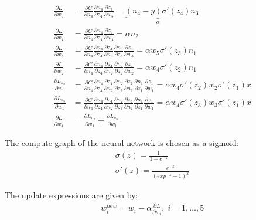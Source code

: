 \documentclass[a4paper,12pt]{article}
\begin{document}
\begin{equation}
\begin{align}
\frac{\partial L}{\partial w_5} &=\frac{\partial C}{\partial n_4}\frac{\partial n_4}{\partial z_4}\frac{\partial z_4}{\partial w_5}=\underbrace{(n_4-y)\sigma'(z_4)}_{\alpha}n_3\\
\frac{\partial L}{\partial w_4} &=\frac{\partial C}{\partial n_4}\frac{\partial n_4}{\partial z_4}\frac{\partial z_4}{\partial w_4}=\alpha n_2\\
\frac{\partial L}{\partial w_3} &= \frac{\partial C}{\partial n_4}\frac{\partial n_4}{\partial z_4}\frac{\partial z_4}{\partial n_3} \frac{\partial n_3}{\partial z_3}\frac{\partial z_3}{\partial w_3} = \alpha w_5\sigma'(z_3)n_1\\
\frac{\partial L}{\partial w_2} &= \frac{\partial C}{\partial n_4}\frac{\partial n_4}{\partial z_4}\frac{\partial z_4}{\partial n_2} \frac{\partial n_2}{\partial z_2}\frac{\partial z_2}{\partial w_2}= \alpha w_4\sigma'(z_2) n_1 \\
\frac{\partial L_{n_2}}{\partial w_1} &= \frac{\partial C}{\partial n_4}\frac{\partial n_4}{\partial z_4}\frac{\partial z_4}{\partial n_2} \frac{\partial n_2}{\partial z_2}\frac{\partial z_2}{\partial n_1}\frac{\partial n_1}{\partial z_1}\frac{\partial z_1}{\partial w_1}= \alpha w_4\sigma'(z_2) w_2 \sigma'(z_1) x\\
\frac{\partial L_{n_3}}{\partial w_1} &= \frac{\partial C}{\partial n_4}\frac{\partial n_4}{\partial z_4}\frac{\partial z_4}{\partial n_2} \frac{\partial n_2}{\partial z_3}\frac{\partial z_3}{\partial n_1}\frac{\partial n_1}{\partial z_1}\frac{\partial z_1}{\partial w_1} =\alpha w_4 \sigma'(z_3) w_3 \sigma'(z_1) x\\
\frac{\partial L}{\partial w_4}&=\frac{\partial L_{n_2}}{\partial w_1}+\frac{\partial L_{n_3}}{\partial w_1}
\end{align}
\end{equation}

The compute graph of the neural network is chosen as a sigmoid: 
\begin{equation}
\begin{aligned}
\sigma(z)=\frac{1}{1+e^{-z}} \\
\sigma'(z)=\frac{e^{-z}}{(exp^{-z} + 1)^2}
\end{aligned}
\end{equation}

The update expressions are given by:
\begin{equation}
\begin{aligned}
w^{new}_i=w_i-\alpha \frac{\partial L}{\partial w_i}, \; i=1,\ldots, 5
\end{aligned}
\end{equation}
\end{document}
